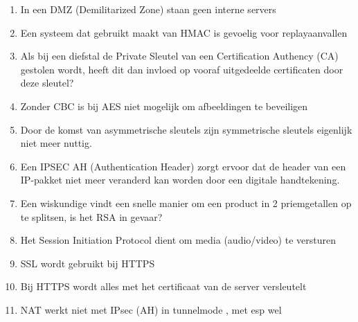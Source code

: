 \begin{enumerate}
\begin{enumerate}
\enumeratext{}

        \item	In een DMZ (Demilitarized Zone) staan geen interne servers

\enumeratext{}

        \item	Een systeem dat gebruikt maakt van HMAC is gevoelig voor replayaanvallen

\enumeratext{}

        \item	Als bij een diefstal de Private Sleutel van een Certification Authency (CA) gestolen wordt, heeft dit dan invloed op vooraf uitgedeelde certificaten door deze sleutel?

\enumeratext{}

        \item	Zonder CBC is bij AES niet mogelijk om afbeeldingen te beveiligen

\enumeratext{}

        \item	Door de komst van asymmetrische sleutels zijn symmetrische sleutels eigenlijk niet meer nuttig.

\enumeratext{}

        \item	Een IPSEC AH (Authentication Header) zorgt ervoor dat de header van een IP-pakket niet meer veranderd kan worden door een digitale handtekening.

\enumeratext{}

        \item	Een wiskundige vindt een snelle manier om een product in 2 priemgetallen op te splitsen, is het RSA in gevaar?

\enumeratext{}

        \item	Het Session Initiation Protocol dient om media (audio/video) te versturen

\enumeratext{}

        \item	SSL wordt gebruikt bij HTTPS
                

                
        \item	Bij HTTPS wordt alles met het certificaat van de server versleutelt

\enumeratext{}

        \item	NAT werkt niet met IPsec (AH) in tunnelmode , met esp wel


\end{enumerate}
\end{enumerate}
